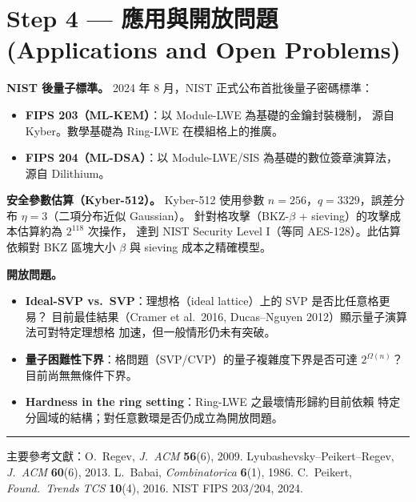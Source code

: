 \documentclass[12pt, a4paper]{article}
\begin{document}
\section{Step 4 \;—\; 應用與開放問題 \small\normalfont\color{gray}(Applications and Open Problems)}

\textbf{NIST 後量子標準。}
2024 年 8 月，NIST 正式公布首批後量子密碼標準：
\begin{itemize}\setlength{\itemsep}{1pt}
  \item \textbf{FIPS 203（ML-KEM）}：以 Module-LWE 為基礎的金鑰封裝機制，
    源自 Kyber。數學基礎為 Ring-LWE 在模組格上的推廣。
  \item \textbf{FIPS 204（ML-DSA）}：以 Module-LWE/SIS 為基礎的數位簽章演算法，
    源自 Dilithium。
\end{itemize}

\textbf{安全參數估算（Kyber-512）。}
Kyber-512 使用參數 $n=256$，$q=3329$，誤差分布 $\eta=3$（二項分布近似 Gaussian）。
針對格攻擊（BKZ-$\beta$ + sieving）的攻擊成本估算約為 $2^{118}$ 次操作，
達到 NIST Security Level I（等同 AES-128）。此估算依賴對 BKZ 區塊大小 $\beta$ 與
sieving 成本之精確模型。

\textbf{開放問題。}
\begin{itemize}\setlength{\itemsep}{1pt}
  \item \textbf{Ideal-SVP vs.\ SVP}：理想格（ideal lattice）上的 SVP 是否比任意格更易？
    目前最佳結果（Cramer et al.\ 2016, Ducas--Nguyen 2012）顯示量子演算法可對特定理想格
    加速，但一般情形仍未有突破。
  \item \textbf{量子困難性下界}：格問題（SVP/CVP）的量子複雜度下界是否可達
    $2^{\Omega(n)}$？目前尚無無條件下界。
  \item \textbf{Hardness in the ring setting}：Ring-LWE 之最壞情形歸約目前依賴
    特定分圓域的結構；對任意數環是否仍成立為開放問題。
\end{itemize}

\vspace{10pt}
\noindent\rule{\linewidth}{0.4pt}
\begin{center}
  \small\color{gray}
  主要參考文獻：O.\ Regev, \textit{J.\ ACM} \textbf{56}(6), 2009.\quad
  Lyubashevsky--Peikert--Regev, \textit{J.\ ACM} \textbf{60}(6), 2013.\quad
  L.\ Babai, \textit{Combinatorica} \textbf{6}(1), 1986.\quad
  C.\ Peikert, \textit{Found.\ Trends TCS} \textbf{10}(4), 2016.\quad
  NIST FIPS 203/204, 2024.
\end{center}
\end{document}
